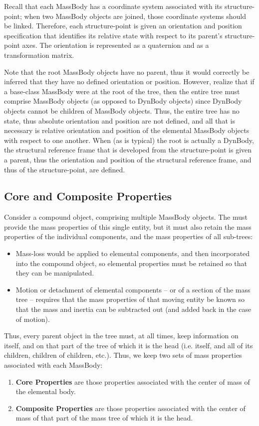 Recall that each MassBody has a coordinate system associated with its
structure-point; when two MassBody objects are joined, those coordinate
systems should be linked.  Therefore, each
structure-point is given an orientation and position
specification that identifies its relative state with respect to its parent's
structure-point axes.  The orientation is represented as a quaternion and as a
transformation matrix.

Note that the root MassBody objects have no parent, thus it would correctly be
inferred that they have no defined orientation or position.  However, realize
that if a base-class
MassBody were at the root of the tree, then the entire tree
must comprise MassBody objects (as opposed to DynBody objects) since DynBody
objects cannot be children of MassBody objects.  Thus, the entire tree has
no state, thus absolute orientation and position are not defined, and all that
is necessary
is relative orientation and position of the elemental MassBody objects with
respect to one
another.  When (as is typical) the root is actually a DynBody, the structural
reference frame that is developed from the structure-point is given a parent,
thus the orientation and position of the structural reference frame, and thus
of the structure-point, are defined.

\subsection{Core and Composite Properties}\label{sec:core_comp_prop}
Consider a compound object, comprising multiple MassBody objects.  The
\ModelDesc must provide the mass properties of this single entity, but it must
also retain the mass properties of the individual components, and the mass
properties of all sub-trees:
\begin{itemize}
 \item Mass-loss would be applied to elemental components, and then
 incorporated
 into the compound object, so elemental properties must be retained so that
 they can be manipulated.
 \item Motion or detachment of elemental components -- or of a section of the
 mass tree --
 requires that the mass properties of that moving entity be known so that
 the mass and inertia can be subtracted out (and added back in the case of
 motion).
\end{itemize}
Thus, every parent object in the tree must, at all times, keep information on
itself, and on that part of the tree of which it is the head (i.e. itself, and
all of its children, children of children, etc.).  Thus, we keep two sets of
mass properties associated with each MassBody:
\begin{enumerate}
 \item \textbf{Core Properties} are those properties associated with the
 center of mass of the elemental body.
 \item \textbf{Composite Properties} are those properties associated with the
 center of mass of that part of the mass tree of which it is the head.
\end{enumerate}

